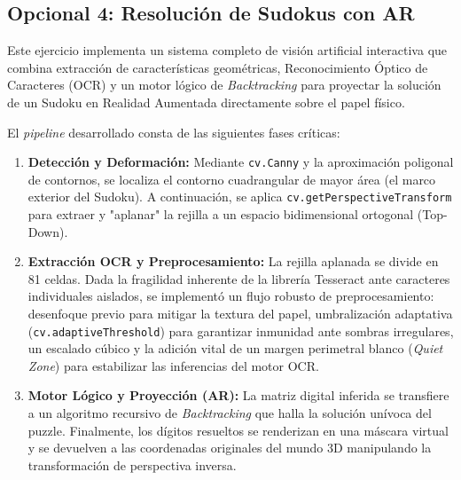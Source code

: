 \documentclass[12pt,a4paper]{article}
\begin{document}
\newpage
\subsection{Opcional 4: Resolución de Sudokus con AR}
Este ejercicio implementa un sistema completo de visión artificial interactiva que combina extracción de características geométricas, Reconocimiento Óptico de Caracteres (OCR) y un motor lógico de \textit{Backtracking} para proyectar la solución de un Sudoku en Realidad Aumentada directamente sobre el papel físico.

El \textit{pipeline} desarrollado consta de las siguientes fases críticas:
\begin{enumerate}
    \item \textbf{Detección y Deformación:} Mediante \texttt{cv.Canny} y la aproximación poligonal de contornos, se localiza el contorno cuadrangular de mayor área (el marco exterior del Sudoku). A continuación, se aplica \texttt{cv.getPerspectiveTransform} para extraer y "aplanar" la rejilla a un espacio bidimensional ortogonal (Top-Down).
    \item \textbf{Extracción OCR y Preprocesamiento:} La rejilla aplanada se divide en 81 celdas. Dada la fragilidad inherente de la librería Tesseract ante caracteres individuales aislados, se implementó un flujo robusto de preprocesamiento: desenfoque previo para mitigar la textura del papel, umbralización adaptativa (\texttt{cv.adaptiveThreshold}) para garantizar inmunidad ante sombras irregulares, un escalado cúbico y la adición vital de un margen perimetral blanco (\textit{Quiet Zone}) para estabilizar las inferencias del motor OCR.
    \item \textbf{Motor Lógico y Proyección (AR):} La matriz digital inferida se transfiere a un algoritmo recursivo de \textit{Backtracking} que halla la solución unívoca del puzzle. Finalmente, los dígitos resueltos se renderizan en una máscara virtual y se devuelven a las coordenadas originales del mundo 3D manipulando la transformación de perspectiva inversa.
\end{enumerate}
\end{document}
